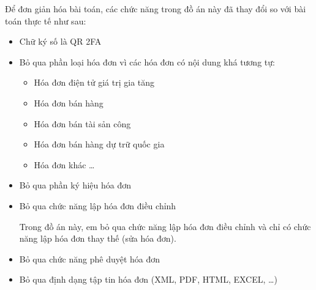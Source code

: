 Để đơn giản hóa bài toán, các chức năng trong đồ án này đã thay đổi so với bài toán thực tế như sau:

\begin{itemize}

\item Chữ ký số là QR 2FA





\item Bỏ qua phần loại hóa đơn vì các hóa đơn có nội dung khá tương tự:

\begin{itemize}

\item Hóa đơn điện tử giá trị gia tăng

\item Hóa đơn bán hàng

\item Hóa đơn bán tài sản công

\item Hóa đơn bán hàng dự trữ quốc gia

\item Hóa đơn khác \dots

\end{itemize}

\item Bỏ qua phần ký hiệu hóa đơn


\item Bỏ qua chức năng lập hóa đơn điều chỉnh

Trong đồ án này, em bỏ qua chức năng lập hóa đơn điều chỉnh và chỉ có chức năng lập hóa đơn thay thế (sửa hóa đơn).

\item Bỏ qua chức năng phê duyệt hóa đơn

\item Bỏ qua định dạng tập tin hóa đơn (XML, PDF, HTML, EXCEL, \dots)

\end{itemize}